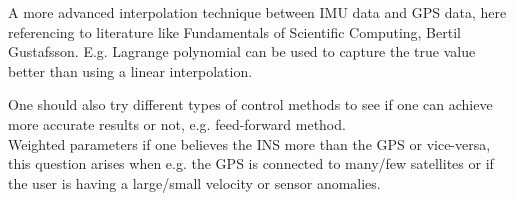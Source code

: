 A more advanced interpolation technique between IMU data and GPS data, here referencing to literature like Fundamentals of Scientific Computing, Bertil Gustafsson. E.g. Lagrange polynomial can be used to capture the true value better than using a linear interpolation.\newline


One should also try different types of control methods to see if one can achieve more accurate results or not, e.g. feed-forward method.\\
Weighted parameters if one believes the INS more than the GPS or vice-versa, this question arises when e.g. the GPS is connected to many/few satellites or if the user is having a large/small velocity or sensor anomalies. \\ \\

